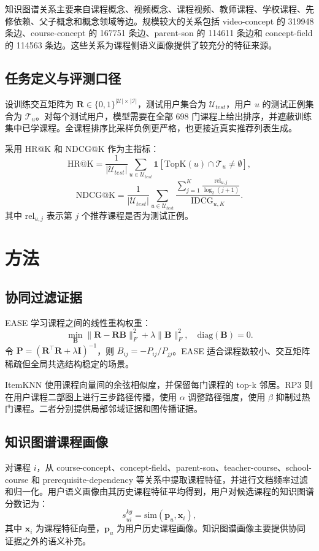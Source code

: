 \documentclass[10pt,twoside,twocolumn]{article}
\begin{document}
知识图谱关系主要来自课程概念、视频概念、课程视频、教师课程、学校课程、先修依赖、父子概念和概念领域等边。规模较大的关系包括 video-concept 的 319948 条边、course-concept 的 167751 条边、parent-son 的 114611 条边和 concept-field 的 114563 条边。这些关系为课程侧语义画像提供了较充分的特征来源。

\subsection{任务定义与评测口径}
设训练交互矩阵为 $\bm{R}\in\{0,1\}^{|\mathcal{U}|\times|\mathcal{I}|}$，测试用户集合为 $\mathcal{U}_{test}$，用户 $u$ 的测试正例集合为 $\mathcal{T}_u$。对每个测试用户，模型需要在全部 698 门课程上给出排序，并遮蔽训练集中已学课程。全课程排序比采样负例更严格，也更接近真实推荐列表生成。

采用 HR@K 和 NDCG@K 作为主指标：
\begin{equation}
\mathrm{HR@K}=\frac{1}{|\mathcal{U}_{test}|}\sum_{u\in\mathcal{U}_{test}}\mathbf{1}[\mathrm{TopK}(u)\cap\mathcal{T}_u\neq\emptyset],
\end{equation}
\begin{equation}
\mathrm{NDCG@K}=\frac{1}{|\mathcal{U}_{test}|}\sum_{u\in\mathcal{U}_{test}}
\frac{\sum_{j=1}^{K}\frac{\mathrm{rel}_{u,j}}{\log_2(j+1)}}{\mathrm{IDCG}_{u,K}}.
\end{equation}
其中 $\mathrm{rel}_{u,j}$ 表示第 $j$ 个推荐课程是否为测试正例。

\section{方法}
\subsection{协同过滤证据}
EASE 学习课程之间的线性重构权重：
\begin{equation}
\min_{\bm{B}}\|\bm{R}-\bm{R}\bm{B}\|_F^2+\lambda\|\bm{B}\|_F^2,\quad
\mathrm{diag}(\bm{B})=0.
\end{equation}
令 $\bm{P}=(\bm{R}^{\top}\bm{R}+\lambda\bm{I})^{-1}$，则 $B_{ij}=-P_{ij}/P_{jj}$。EASE 适合课程数较小、交互矩阵稀疏但全局共选结构稳定的场景。

ItemKNN 使用课程向量间的余弦相似度，并保留每门课程的 top-k 邻居。RP3 则在用户课程二部图上进行三步路径传播，使用 $\alpha$ 调整路径强度，使用 $\beta$ 抑制过热门课程。二者分别提供局部邻域证据和图传播证据。

\subsection{知识图谱课程画像}
对课程 $i$，从 course-concept、concept-field、parent-son、teacher-course、school-course 和 prerequisite-dependency 等关系中提取课程特征，并进行文档频率过滤和归一化。用户语义画像由其历史课程特征平均得到，用户对候选课程的知识图谱分数记为：
\begin{equation}
s^{kg}_{ui}=\mathrm{sim}(\bm{p}_u,\bm{x}_i),
\end{equation}
其中 $\bm{x}_i$ 为课程特征向量，$\bm{p}_u$ 为用户历史课程画像。知识图谱画像主要提供协同证据之外的语义补充。
\end{document}
